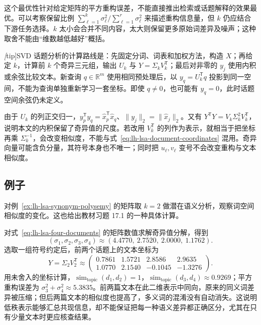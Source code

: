 这个最优性针对给定矩阵的平方重构误差，不能直接推出检索或话题解释的效果最优。可以考察保留比例 $\sum_{\ell=1}^k\sigma_\ell^2/\sum_{\ell=1}^r\sigma_\ell^2$ 来描述重构信息量，但 $k$ 仍应结合下游任务选择。$k$ 太小会合并不同内容，太大则保留更多原始词差异及噪声；这种取舍不能由“维数越低越好”概括。

\emph[tip]{SVD 话题分析的计算路线}是：先固定分词、词表和加权方法，构造 $X$；再给定 $k$，计算前 $k$ 个奇异三元组，输出 $U_k$ 与 $Y=\Sigma_kV_k^{\mathsf T}$；最后对非零的 $y_j$ 使用内积或余弦比较文本。新查询 $q\in\mathbb R^m$ 使用相同预处理后，以 $y_q=U_k^{\mathsf T}q$ 投影到同一空间，不能为查询单独重新学习一套坐标。即使 $q\ne0$，也可能有 $y_q=0$，此时话题空间余弦仍未定义。

由于 $U_k$ 的列正交归一，$y_p^{\mathsf T}y_q=\widehat x_p^{\mathsf T}\widehat x_q$、$\|y_j\|_2=\|\widehat x_j\|_2$。又有 $Y^{\mathsf T}Y=V_k\Sigma_k^2V_k^{\mathsf T}$，说明本文的内积保留了奇异值的尺度。若改用 $V_k^{\mathsf T}$ 的列作为表示，就相当于把坐标再乘 $\Sigma_k^{-1}$，会改变相似度，不能与式~\eqref{eq:lh-lsa-document-coordinates} 混用。奇异向量可能含负分量，其符号本身也不唯一；同时把 $u_\ell,v_\ell$ 变号不会改变重构与文本相似度。

\subsection{例子}
\label{subsec:lh-lsa-examples}

\begin{example}
\label{ex:lh-lsa-four-documents-svd}
对例~\ref{ex:lh-lsa-synonym-polysemy} 的矩阵取 $k=2$ 做潜在语义分析，观察词空间相似度的变化。这也给出教材习题 17.1 的一种具体计算。
\end{example}
\begin{solve}
对式~\eqref{eq:lh-lsa-four-documents} 的矩阵数值求解奇异值分解，得到
\[
(\sigma_1,\sigma_2,\sigma_3,\sigma_4)
\approx(4.4770,\ 2.7520,\ 2.0000,\ 1.1762).
\]
选取一组符号约定后，前两个话题上的文本坐标为
\begin{equation}
Y=\Sigma_2V_2^{\mathsf T}\approx
\begin{pmatrix}
0.7861&1.5721&2.8586&2.9635\\
1.0770&2.1540&-0.1045&-1.3276
\end{pmatrix}.
\label{eq:lh-lsa-four-documents-coordinates}
\end{equation}
用未舍入的坐标计算，$\operatorname{sim}_{\mathrm{topic}}(d_1,d_2)=1$，$\operatorname{sim}_{\mathrm{topic}}(d_3,d_4)\approx0.9269$；平方重构误差为 $\sigma_3^2+\sigma_4^2\approx5.3835$。前两篇文本在此二维表示中同向，原来的同义词差异被压缩；但后两篇文本的相似度也提高了，多义词的混淆没有自动消失。这说明低秩表示能够汇总共现信息，却不能保证把每一种语义差异都正确区分，尤其在只有少量文本时更应核查结果。
\end{solve}

